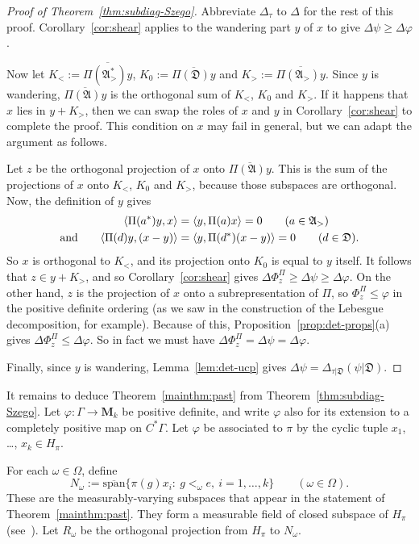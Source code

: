 \documentclass[12pt,a4paper]{article}
\numberwithin{equation}{section}
\theoremstyle{remark}
\renewcommand{\rm}[1]{\mathrm{#1}}
\newcommand{\rmM}{\mathbf{M}}
\newcommand{\A}{\mathfrak{A}}
\newcommand{\frD}{\mathfrak{D}}
\newcommand{\G}{\Gamma}
\renewcommand{\phi}{\varphi}
\newcommand{\ol}[1]{\overline{#1}}
\begin{document}
\begin{proof}[Proof of Theorem~\ref{thm:subdiag-Szego}]
Abbreviate $\Delta_\tau$ to $\Delta$ for the rest of this proof. Corollary~\ref{cor:shear} applies to the wandering part $y$ of $x$ to give $\Delta \psi \ge \Delta \phi$.

Now let $K_<:= \ol{\Pi(\A^\ast_>)y}$, $K_0 := \ol{\Pi(\frD)y}$ and $K_> := \ol{\Pi(\A_>)y}$.  Since $y$ is wandering, $\ol{\Pi(\A)y}$ is the orthogonal sum of $K_<$, $K_0$ and $K_>$.  If it happens that $x$ lies in $y + K_>$, then we can swap the roles of $x$ and $y$ in Corollary~\ref{cor:shear} to complete the proof.  This condition on $x$ may fail in general, but we can adapt the argument as follows.

Let $z$ be the orthogonal projection of $x$ onto $\ol{\Pi(\A)y}$.  This is the sum of the projections of $x$ onto $K_<$, $K_0$ and $K_>$, because those subspaces are orthogonal.  Now, the definition of $y$ gives
\begin{align*}
\langle \Pi(a^\ast)y,x\rangle &= \langle y,\Pi(a)x\rangle = 0 \qquad (a \in \A_>)\\
\hbox{and} \qquad \langle \Pi(d)y,(x-y)\rangle &= \langle y,\Pi(d^\ast)(x-y)\rangle = 0 \qquad (d \in \frD).
\end{align*}
So $x$ is orthogonal to $K_<$, and its projection onto $K_0$ is equal to $y$ itself.  It follows that $z \in y + K_>$, and so Corollary~\ref{cor:shear} gives $\Delta \Phi^\Pi_z \ge \Delta \psi \ge \Delta \phi$.  On the other hand, $z$ is the projection of $x$ onto a subrepresentation of $\Pi$, so $\Phi^\Pi_z \le \phi$ in the positive definite ordering (as we saw in the construction of the Lebesgue decomposition, for example).  Because of this, Proposition~\ref{prop:det-props}(a) gives $\Delta\Phi^\Pi_z \le \Delta \phi$.  So in fact we must have $\Delta \Phi^\Pi_z = \Delta \psi = \Delta \phi$.

Finally, since $y$ is wandering, Lemma~\ref{lem:det-ucp} gives $\Delta \psi = \Delta_{\tau|\frD}(\psi|\frD)$.
\end{proof}

It remains to deduce Theorem~\ref{mainthm:past} from Theorem~\ref{thm:subdiag-Szego}.  Let $\phi:\G\to \rmM_k$ be positive definite, and write $\phi$ also for its extension to a completely positive map on $C^\ast \G$.  Let $\phi$ be associated to $\pi$ by the cyclic tuple $x_1$, \dots, $x_k \in H_\pi$.


For each $\omega \in \Omega$, define
\begin{equation}\label{eq:local-past}
N_\omega:= \ol{\rm{span}}\{\pi(g)x_i:\ g <_\omega e,\ i=1,\dots,k\} \qquad (\omega \in \Omega).
\end{equation}
These are the measurably-varying subspaces that appear in the statement of Theorem~\ref{mainthm:past}.  They form a measurable field of closed subspace of $H_\pi$ (see~\cite[Chap. II.1]{Dix--vN}).  Let $R_\omega$ be the orthogonal projection from $H_\pi$ to $N_\omega$.
\end{document}
